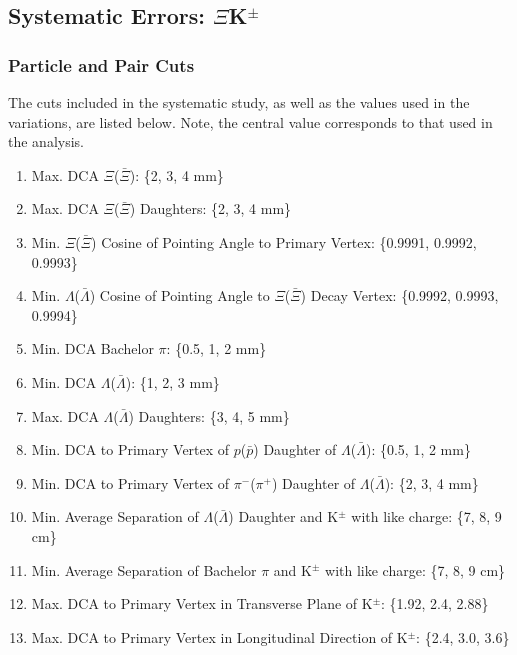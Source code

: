 \documentclass[../AnalysisNoteJBuxton.tex]{subfiles}
\begin{document}
\subsection{Systematic Errors: \texorpdfstring{$\Xi$K$^{\pm}$}{TEXT}}
\label{SysErrsXiKch}

\subsubsection{Particle and Pair Cuts}
\label{SysErrsXiKch:ParticleAndPairCuts}

The cuts included in the systematic study, as well as the values used in the variations, are listed below.  Note, the central value corresponds to that used in the analysis.

\begin{enumerate}
 \item Max. DCA $\Xi$($\bar{\Xi}$): \{2, 3, 4 mm\}
 \item Max. DCA $\Xi$($\bar{\Xi}$) Daughters: \{2, 3, 4 mm\}
 \item Min. $\Xi$($\bar{\Xi}$) Cosine of Pointing Angle to Primary Vertex: \{0.9991, 0.9992, 0.9993\} 
 \item Min. $\Lambda$($\bar{\Lambda}$) Cosine of Pointing Angle to $\Xi$($\bar{\Xi}$) Decay Vertex: \{0.9992, 0.9993, 0.9994\} 
 \item Min. DCA Bachelor $\pi$: \{0.5, 1, 2 mm\}
 \item Min. DCA $\Lambda$($\bar{\Lambda}$): \{1, 2, 3 mm\}
 \item Max. DCA $\Lambda$($\bar{\Lambda}$) Daughters: \{3, 4, 5 mm\}
 \item Min. DCA to Primary Vertex of $p$($\bar{p}$) Daughter of $\Lambda$($\bar{\Lambda}$):  \{0.5, 1, 2 mm\}
 \item Min. DCA to Primary Vertex of $\pi^{-}$($\pi^{+}$) Daughter of $\Lambda$($\bar{\Lambda}$):  \{2, 3, 4 mm\} 
 \item Min. Average Separation of $\Lambda$($\bar{\Lambda}$) Daughter and K$^{\pm}$ with like charge: \{7, 8, 9 cm\}
 \item Min. Average Separation of Bachelor $\pi$ and K$^{\pm}$ with like charge: \{7, 8, 9 cm\}
 \item Max. DCA to Primary Vertex in Transverse Plane of K$^{\pm}$: \{1.92, 2.4, 2.88\}
 \item Max. DCA to Primary Vertex in Longitudinal Direction of K$^{\pm}$: \{2.4, 3.0, 3.6\}
\end{enumerate}
\end{document}
